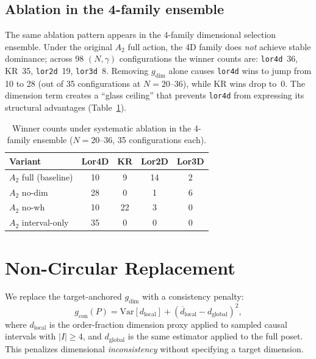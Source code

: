 \documentclass[12pt,a4paper]{article}
\begin{document}
\subsection{Ablation in the 4-family ensemble}
\label{sec:ablation_a}

The same ablation pattern appears in the 4-family dimensional selection ensemble.
Under the original $A_2$ full action, the 4D family does \emph{not} achieve
stable dominance; across 98 $(N, \gamma)$ configurations the winner counts are:
\texttt{lor4d}~36, KR~35, \texttt{lor2d}~19, \texttt{lor3d}~8. Removing
$g_{\text{dim}}$ alone causes \texttt{lor4d} wins to jump from 10 to 28 (out of
35 configurations at $N = 20$--$36$), while KR wins drop to~0. The dimension
term creates a ``glass ceiling'' that prevents \texttt{lor4d} from expressing its
structural advantages (Table~\ref{tab:ablation_a}).

\begin{table}[h]
\centering
\caption{Winner counts under systematic ablation in the 4-family ensemble
($N = 20$--$36$, 35 configurations each).}
\label{tab:ablation_a}
\begin{tabular}{lcccc}
\toprule
\textbf{Variant} & \textbf{Lor4D} & \textbf{KR} & \textbf{Lor2D} &
\textbf{Lor3D} \\
\midrule
$A_2$ full (baseline) & 10 & 9 & 14 & 2 \\
$A_2$ no-dim & 28 & 0 & 1 & 6 \\
$A_2$ no-wh & 10 & 22 & 3 & 0 \\
$A_2$ interval-only & 35 & 0 & 0 & 0 \\
\bottomrule
\end{tabular}
\end{table}

\section{Non-Circular Replacement}
\label{sec:replacement}

We replace the target-anchored $g_{\text{dim}}$ with a consistency penalty:
\begin{equation}
    g_{\text{con}}(P) = \mathrm{Var}[d_{\text{local}}]
    + (\overline{d}_{\text{local}} - d_{\text{global}})^2,
    \label{eq:gcon}
\end{equation}
where $d_{\text{local}}$ is the order-fraction dimension proxy applied to
sampled causal intervals with $|I| \geq 4$, and $d_{\text{global}}$ is the
same estimator applied to the full poset. This penalizes dimensional
\emph{inconsistency} without specifying a target dimension.
\end{document}

